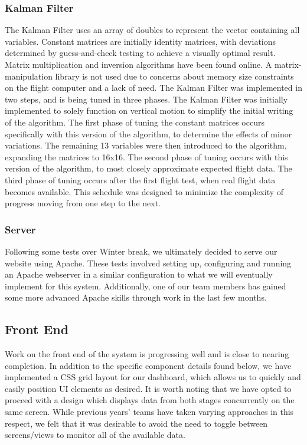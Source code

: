 \documentclass[journal,10pt,onecolumn,compsoc]{IEEEtran}
\begin{document}
		\subsubsection{Kalman Filter}
			The Kalman Filter uses an array of doubles to represent the vector containing all variables.
			Constant matrices are initially identity matrices, with deviations determined by guess-and-check testing to achieve a visually optimal result.
			Matrix multiplication and inversion algorithms have been found online.
			A matrix-manipulation library is not used due to concerns about memory size constraints on the flight computer and a lack of need.
			The Kalman Filter was implemented in two steps, and is being tuned in three phases.
			The Kalman Filter was initially implemented to solely function on vertical motion to simplify the initial writing of the algorithm.
			The first phase of tuning the constant matrices occurs specifically with this version of the algorithm, to determine the effects of minor variations.
			The remaining 13 variables were then introduced to the algorithm, expanding the matrices to 16x16.
			The second phase of tuning occurs with this version of the algorithm, to most closely approximate expected flight data.
			The third phase of tuning occurs after the first flight test, when real flight data becomes available.
			This schedule was designed to minimize the complexity of progress moving from one step to the next.
			
		\subsubsection{Server}
			Following some tests over Winter break, we ultimately decided to serve our website using Apache.
			These tests involved setting up, configuring and running an Apache webserver in a similar configuration to what we will eventually implement for this system.
			Additionally, one of our team members has gained some more advanced Apache skills through work in the last few months.
	
	\subsection{Front End}
		Work on the front end of the system is progressing well and is close to nearing completion.
		In addition to the specific component details found below, we have implemented a CSS grid layout for our dashboard, which allows us to quickly and easily position UI elements as desired.
		It is worth noting that we have opted to proceed with a design which displays data from both stages concurrently on the same screen.
		While previous years' teams have taken varying approaches in this respect, we felt that it was desirable to avoid the need to toggle between screens/views to monitor all of the available data.
	
\end{document}

